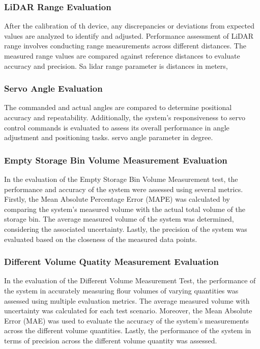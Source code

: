 \subsubsection{LiDAR Range Evaluation}
After the calibration of th device, any discrepancies or deviations from expected values are analyzed to identify and adjusted. Performance assessment of LiDAR range involves conducting range measurements across different distances. The measured range values are compared against reference distances to evaluate accuracy and precision.
Sa lidar range parameter is distances in meters,
\subsubsection{Servo Angle Evaluation}
The commanded and actual angles are compared to determine positional accuracy and repeatability. Additionally, the system's responsiveness to servo control commands is evaluated to assess its overall performance in angle adjustment and positioning tasks.
servo angle parameter in degree.

\subsubsection{Empty Storage Bin Volume Measurement Evaluation}
In the evaluation of the Empty Storage Bin Volume Measurement test, the performance and accuracy of the system were assessed using several metrics. Firstly, the Mean Absolute Percentage Error (MAPE) was calculated by comparing the system's measured volume with the actual total volume of the storage bin. The average measured volume of the system was determined, considering the associated uncertainty. Lastly, the precision of the system was evaluated based on the closeness of the measured data points.
\subsubsection{Different Volume Quatity Measurement Evaluation}
In the evaluation of the Different Volume Measurement Test, the performance of the system in accurately measuring flour volumes of varying quantities was assessed using multiple evaluation metrics. The average measured volume with uncertainty was calculated for each test scenario. Moreover, the Mean Absolute Error (MAE) was used to evaluate the accuracy of the system's measurements across the different volume quantities. Lastly, the performance of the system in terms of precision across the different volume quantity was assessed.

